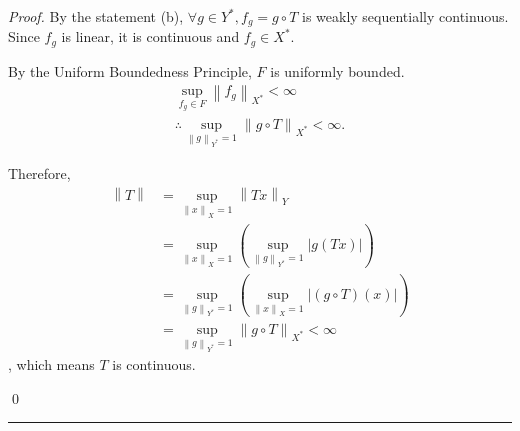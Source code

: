 \documentclass{article}
\newcommand{\norm}[1]{\left\|#1\right\|}
\begin{document}
\begin{proof}
    By the statement (b), $\forall g \in Y^*, f_g = g \circ T$ is weakly sequentially continuous.
    Since $f_g$ is linear, it is continuous and $f_g \in X^*$.

    By the Uniform Boundedness Principle, $F$ is uniformly bounded.
    \begin{align}
        \sup_{f_g \in F} \norm{f_g}_{X^*} 
        < \infty
        \\
        \therefore
        \sup_{\norm{g}_{Y^*}=1} \norm{g \circ T}_{X^*} 
        < \infty.
    \end{align}
    
    Therefore,
    \begin{align}
        \norm{T}
        &= \sup_{\norm{x}_X = 1} \norm{Tx}_Y 
        \\
        &= \sup_{\norm{x}_X = 1} \left( \sup_{\norm{g}_{Y^*} = 1} |g(Tx)| \right)
        \\
        &= \sup_{\norm{g}_{Y^*} = 1} \left( \sup_{\norm{x}_X = 1} |(g \circ T)(x)| \right) 
        \\
        &= \sup_{\norm{g}_{Y^*} = 1} \norm{g \circ T}_{X^*}
        < \infty
    \end{align}
    , which means $T$ is continuous.
    
    \qed
\end{proof}


\hrule
\vspace{0.5em}
\end{document}
